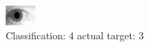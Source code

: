 \begin{figure}[h!]
\begin{center}
\includegraphics[width=0.60\columnwidth]{figures/ID1797_class_4_target_3.png}
\end{center}
\caption{ Classification: 4 actual target: 3}
\label{fig:ID1797_class_4_target_3}
\end{figure}
